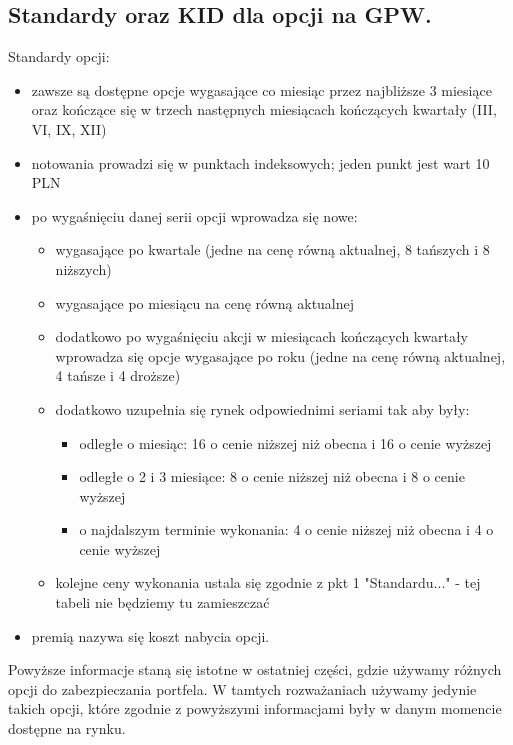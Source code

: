 \documentclass[12pt]{article}
\begin{document}
\subsection{Standardy oraz KID dla opcji na GPW.}

Standardy opcji:
\begin{itemize}
        \item  zawsze są dostępne opcje wygasające co miesiąc przez najbliższe 3 miesiące oraz kończące się w trzech następnych miesiącach kończących kwartały (III, VI, IX, XII)
    \item  notowania prowadzi się w punktach indeksowych; jeden punkt jest wart 10 PLN
    \item po wygaśnięciu danej serii opcji wprowadza się nowe:
    \begin{itemize}
        \item  wygasające po kwartale (jedne na cenę równą aktualnej, 8 tańszych i 8 niższych)
        \item  wygasające po miesiącu na cenę równą aktualnej
        \item  dodatkowo po wygaśnięciu akcji w miesiącach kończących kwartały wprowadza się opcje wygasające po roku (jedne na cenę równą aktualnej, 4 tańsze i 4 droższe)
        \item  dodatkowo uzupełnia się rynek odpowiednimi seriami tak aby były:
        \begin{itemize}
            \item odległe o miesiąc: 16 o cenie niższej niż obecna i 16 o cenie wyższej
            \item odległe o 2 i 3 miesiące: 8 o cenie niższej niż obecna i 8 o cenie wyższej
            \item o najdalszym terminie wykonania: 4 o cenie niższej niż obecna i 4 o cenie wyższej
        \end{itemize}
        \item kolejne ceny wykonania ustala się zgodnie z pkt 1 "Standardu..." - tej tabeli nie będziemy tu zamieszczać
    \end{itemize}
    \item premią nazywa się koszt nabycia opcji.
\end{itemize}
Powyższe informacje staną się istotne w ostatniej części, gdzie używamy różnych opcji do zabezpieczania portfela. W tamtych rozważaniach używamy jedynie takich opcji, które zgodnie z powyższymi informacjami były w danym momencie dostępne na rynku.
\end{document}
